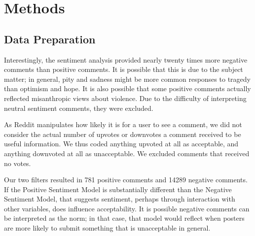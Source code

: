\section{Methods}
\subsection{Data Preparation}
Interestingly, the sentiment analysis provided nearly twenty times more negative comments than positive comments. It is possible that this is due to the subject matter; in general, pity and sadness might be more common responses to tragedy than optimism and hope. It is also possible that some positive comments actually reflected misanthropic views about violence. Due to the difficulty of interpreting neutral sentiment comments, they were excluded.

As Reddit manipulates how likely it is for a user to see a comment, we did not consider the actual number of upvotes or downvotes a comment received to be useful information. We thus coded anything upvoted at all as acceptable, and anything downvoted at all as unacceptable. We excluded comments that received no votes.

Our two filters resulted in 781 positive comments and 14289 negative comments. If the Positive Sentiment Model is substantially different than the Negative Sentiment Model, that suggests sentiment, perhaps through interaction with other variables, does influence acceptability. It is possible negative comments can be interpreted as the norm; in that case, that model would reflect when posters are more likely to submit something that is unacceptable in general. 


